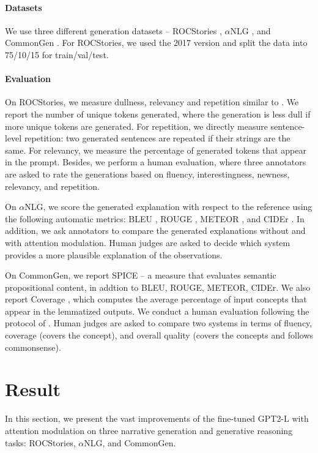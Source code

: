\documentclass[11pt,a4paper]{article}
\newcommand{\alg}{attention modulation}
\begin{document}
\paragraph{Datasets} We use three different generation datasets -- ROCStories \citep{mostafazadeh-etal-2016-corpus}, $\alpha$NLG \citep{bhagavatula2020abductive}, and CommonGen \citep{lin-etal-2020-commongen}. %
For ROCStories, we used the 2017 version and split the data into 75/10/15 for train/val/test. 

\paragraph{Evaluation} On ROCStories, we measure dullness, relevancy and repetition similar to \citet{welleck2020neural}. We report the number of unique tokens generated, where the generation is less dull if more unique tokens are generated. For repetition, we directly measure sentence-level repetition: two generated sentences are repeated if their strings are the same. For relevancy, we measure the percentage of generated tokens that appear in the prompt. Besides, we perform a human evaluation, where three annotators are asked to rate the generations based on fluency, interestingness, newness, relevancy, and repetition.   

On $\alpha$NLG, we score the generated explanation with respect to the reference using the following automatic metrics: BLEU \citep{Papineni2002BleuAM}, ROUGE \citep{Lin2004ROUGEAP}, METEOR \citep{Banerjee2005METEORAA}, and CIDEr \citep{Vedantam2015CIDErCI}. In addition, we ask annotators to compare the generated explanations without and with \alg{}. Human judges are asked to decide which system provides a more plausible explanation of the observations.

On CommonGen, we report SPICE \citep{anderson2016spice} -- a measure that evaluates semantic propositional content, in addtion to BLEU, ROUGE, METEOR, CIDEr. We also report Coverage \citep{lin-etal-2020-commongen}, which computes the average percentage of input concepts that appear in the lemmatized outputs. We conduct a human evaluation following the protocol of \citet{lu2020neurologic}. Human judges are asked to compare two systems in terms of fluency, coverage (covers the concept), and overall quality (covers the concepts and follows commonsense). 




\section{Result}\label{sec:result}
In this section, we present the vast improvements of the fine-tuned GPT2-L with \alg{} on three narrative generation and generative reasoning tasks: ROCStories, $\alpha$NLG, and CommonGen. 
\end{document}
